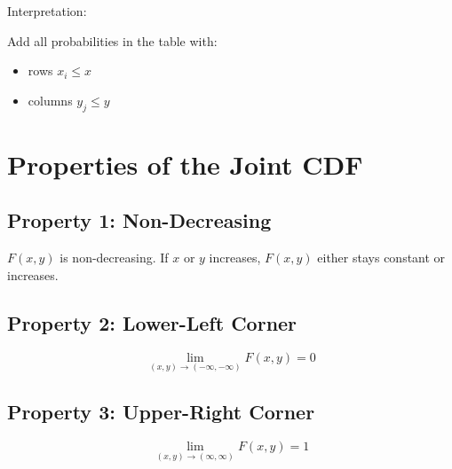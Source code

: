 \documentclass[12pt]{article}
\begin{document}
Interpretation:

Add all probabilities in the table with:

\begin{itemize}
\item rows \(x_i \le x\)
\item columns \(y_j \le y\)
\end{itemize}

\section{Properties of the Joint CDF}

\subsection*{Property 1: Non-Decreasing}

\(F(x,y)\) is non-decreasing. If \(x\) or \(y\) increases, \(F(x,y)\) either stays constant or increases.

\subsection*{Property 2: Lower-Left Corner}

\[
\lim_{(x,y)\to(-\infty,-\infty)} F(x,y) = 0
\]

\subsection*{Property 3: Upper-Right Corner}

\[
\lim_{(x,y)\to(\infty,\infty)} F(x,y) = 1
\]
\end{document}
